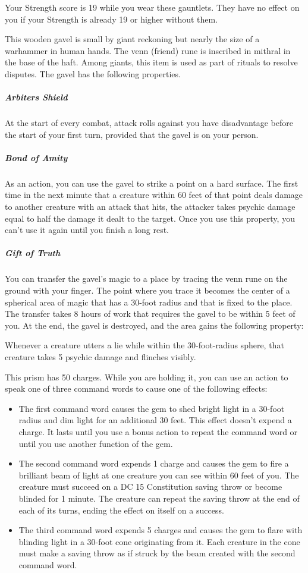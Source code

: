 \documentclass[10pt,a4paper,twoside,bg=print,twocolumn,openany,nodeprecatedcode]{dndbook}
\begin{document}
Your Strength score is 19 while you wear these gauntlets. They have no effect on you if your Strength is already 19 or higher without them.

This wooden gavel is small by giant reckoning but nearly the size of a warhammer in human hands. The venn (friend) rune is inscribed in mithral in the base of the haft. Among giants, this item is used as part of rituals to resolve disputes. The gavel has the following properties.

\subparagraph{Arbiters Shield}
At the start of every combat, attack rolls against you have disadvantage before the start of your first turn, provided that the gavel is on your person.

\subparagraph{Bond of Amity}
As an action, you can use the gavel to strike a point on a hard surface. The first time in the next minute that a creature within 60 feet of that point deals damage to another creature with an attack that hits, the attacker takes psychic damage equal to half the damage it dealt to the target. Once you use this property, you can't use it again until you finish a long rest.

\subparagraph{Gift of Truth}
You can transfer the gavel's magic to a place by tracing the venn rune on the ground with your finger. The point where you trace it becomes the center of a spherical area of magic that has a 30-foot radius and that is fixed to the place. The transfer takes 8 hours of work that requires the gavel to be within 5 feet of you. At the end, the gavel is destroyed, and the area gains the following property:

Whenever a creature utters a lie while within the 30-foot-radius sphere, that creature takes 5 psychic damage and flinches visibly.

This prism has 50 charges. While you are holding it, you can use an action to speak one of three command words to cause one of the following effects:


\begin{itemize}
\item The first command word causes the gem to shed bright light in a 30-foot radius and dim light for an additional 30 feet. This effect doesn't expend a charge. It lasts until you use a bonus action to repeat the command word or until you use another function of the gem.
\item The second command word expends 1 charge and causes the gem to fire a brilliant beam of light at one creature you can see within 60 feet of you. The creature must succeed on a DC 15 Constitution saving throw or become blinded for 1 minute. The creature can repeat the saving throw at the end of each of its turns, ending the effect on itself on a success.
\item The third command word expends 5 charges and causes the gem to flare with blinding light in a 30-foot cone originating from it. Each creature in the cone must make a saving throw as if struck by the beam created with the second command word.
\end{itemize}
\end{document}
